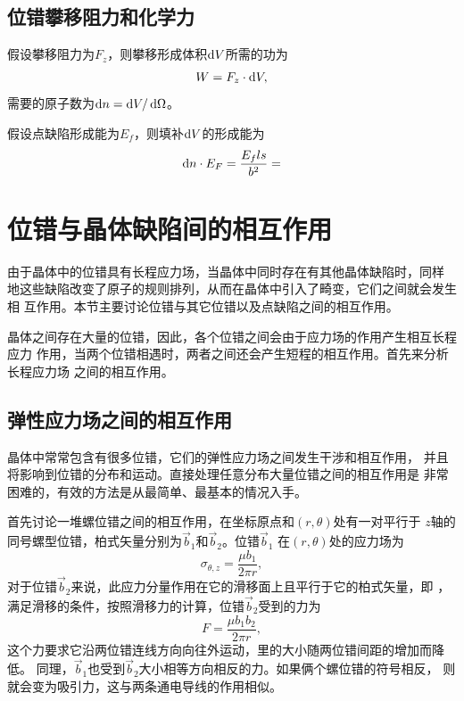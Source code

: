                 \subsection{位错攀移阻力和化学力}
                    假设攀移阻力为$F_z$，则攀移形成体积$\mathop{}\!\mathrm{d} V$所需的功为
                    \begin{equation}
                        W=F_z\cdot\mathop{}\!\mathrm{d} V,
                    \end{equation}
                    需要的原子数为$\mathop{}\!\mathrm{d} n=\mathop{}\!\mathrm{d} V/\mathop{}\!\mathrm{d} \Omega$。

                    假设点缺陷形成能为$E_f$，则填补$\mathop{}\!\mathrm{d} V$的形成能为
                    \begin{equation}
                        \mathop{}\!\mathrm{d} n\cdot E_F=\frac{E_f ls}{b^2}=
                    \end{equation}
        \section{位错与晶体缺陷间的相互作用}
            由于晶体中的位错具有长程应力场，当晶体中同时存在有其他晶体缺陷时，同样
            地这些缺陷改变了原子的规则排列，从而在晶体中引入了畸变，它们之间就会发生相
            互作用。本节主要讨论位错与其它位错以及点缺陷之间的相互作用。
            
            晶体之间存在大量的位错，因此，各个位错之间会由于应力场的作用产生相互长程应力
            作用，当两个位错相遇时，两者之间还会产生短程的相互作用。首先来分析长程应力场
            之间的相互作用。
            \subsection{弹性应力场之间的相互作用}
                    晶体中常常包含有很多位错，它们的弹性应力场之间发生干涉和相互作用，
                    并且将影响到位错的分布和运动。直接处理任意分布大量位错之间的相互作用是
                    非常困难的，有效的方法是从最简单、最基本的情况入手。

                    首先讨论一堆螺位错之间的相互作用，在坐标原点和$(r,\theta)$处有一对平行于
                    $z$轴的同号螺型位错，柏式矢量分别为$\vec{b}_1$和$\vec{b}_2$。位错$\vec{b}_1$
                    在$(r,\theta)$处的应力场为
                    \begin{equation}
                        \sigma_{\theta,z}=\frac{\mu b_1}{2\pi r},
                    \end{equation}
                    对于位错$\vec{b}_2$来说，此应力分量作用在它的滑移面上且平行于它的柏式矢量，即
                    ，满足滑移的条件，按照滑移力的计算，位错$\vec{b}_2$受到的力为
                    \begin{equation}
                        F=\frac{\mu b_1 b_2}{2\pi r},    
                    \end{equation}
                    这个力要求它沿两位错连线方向向往外运动，里的大小随两位错间距的增加而降低。
                    同理，$\vec{b}_1$也受到$\vec{b}_2$大小相等方向相反的力。如果俩个螺位错的符号相反，
                    则就会变为吸引力，这与两条通电导线的作用相似。
                    
